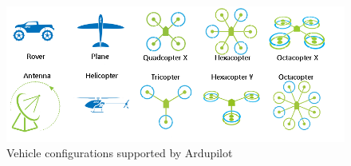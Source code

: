 
\begin{figure}[htbp]
	\centering
	\includegraphics[width=\textwidth]{./figures/vehicles.png}
	\caption{Vehicle configurations supported by Ardupilot}
	\label{fig:vehicles}
\end{figure}
